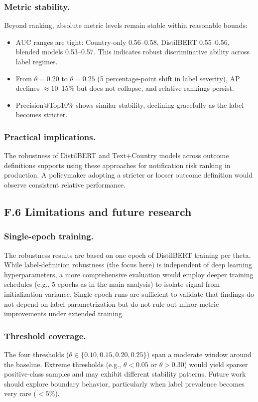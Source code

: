 \documentclass[11pt,a4paper]{article}
\begin{document}
\subsubsection*{Metric stability.}
Beyond ranking, absolute metric levels remain stable within reasonable bounds:
\begin{itemize}
  \item AUC ranges are tight: Country-only 0.56--0.58, DistilBERT 0.55--0.56, blended models 0.53--0.57. This indicates robust discriminative ability across label regimes.
  \item From $\theta=0.20$ to $\theta=0.25$ (5 percentage-point shift in label severity), AP declines $\approx 10$--15\% but does not collapse, and relative rankings persist.
  \item Precision@Top10\% shows similar stability, declining gracefully as the label becomes stricter.
\end{itemize}

\subsubsection*{Practical implications.}
The robustness of DistilBERT and Text+Country models across outcome definitions supports using these approaches for notification risk ranking in production. A policymaker adopting a stricter or looser outcome definition would observe consistent relative performance.

\subsection*{F.6 Limitations and future research}

\subsubsection*{Single-epoch training.}
The robustness results are based on one epoch of DistilBERT training per theta. While label-definition robustness (the focus here) is independent of deep learning hyperparameters, a more comprehensive evaluation would employ deeper training schedules (e.g., 5 epochs as in the main analysis) to isolate signal from initialization variance. Single-epoch runs are sufficient to validate that findings do not depend on label parametrization but do not rule out minor metric improvements under extended training.

\subsubsection*{Threshold coverage.}
The four thresholds ($\theta \in \{0.10, 0.15, 0.20, 0.25\}$) span a moderate window around the baseline. Extreme thresholds (e.g., $\theta < 0.05$ or $\theta > 0.30$) would yield sparser positive-class samples and may exhibit different stability patterns. Future work should explore boundary behavior, particularly when label prevalence becomes very rare ($< 5\%$).
\end{document}
